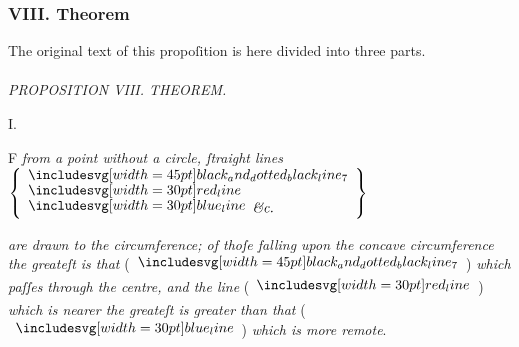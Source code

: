\documentclass[12pt,preview]{standalone}
\begin{document}
\null\removelastskip\nointerlineskip\vspace*{-\baselineskip}

\subsubsection{VIII. Theorem}

\begin{minipage}[t]{0.64\textwidth}
    \vspace{0pt}

    \begin{center}
        The original text of this propoſition is here divided into three parts.\\
        \hfill\\
        \textit{PROPOSITION VIII. THEOREM.}\label{book3pr8}
    \end{center}

    \hfill

    \begin{center}
        I.\\
        \raggedright \lettrine[lines=4, loversize=1, nindent=0pt]{}{}F \textit{from a point without a circle, ſtraight lines}\\ $\left\{\begin{aligned}                                                   & \bimg{black_and_dotted_black_line_7} \\[-2ex] & \redline \\[-2ex] & \blueline \textit{\&c.}
            \end{aligned}\right\}$
    \end{center}
    \raggedright \textit{are drawn to the circumference; of thoſe falling upon the concave circumference the greateſt is that} (\hspace{-1ex}$\bimg{black_and_dotted_black_line_7}$\hspace{-1ex}) \textit{which paſſes through the centre, and the line} (\hspace{-1ex}$\redline$\hspace{-1ex}) \textit{which is nearer the greateſt is greater than  that} (\hspace{-1ex}$\blueline$\hspace{-1ex}) \textit{which is more remote}.

    \hfill

    \hfill


\end{minipage}
\end{document}
